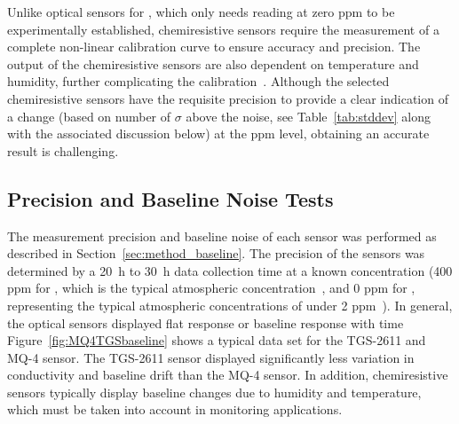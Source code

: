 \documentclass[sensors,article,submit,moreauthors,pdftex]{Definitions/mdpi}
\begin{document}
			Unlike optical sensors for , which only needs reading at zero ppm to be experimentally established, chemiresistive sensors require the measurement of a complete non-linear calibration curve to ensure accuracy and precision.
			The output of the chemiresistive sensors are also dependent on temperature and humidity, further complicating the calibration~\cite{benkstein_analytical_2014}.
			Although the selected chemiresistive sensors have the requisite precision to provide a clear indication of a change (based on number of $\sigma$ above the noise, see Table~\ref{tab:stddev} along with the associated discussion below) at the ppm level, obtaining an accurate result is challenging.
			

		\subsection{Precision and Baseline Noise Tests}
			\label{sec:main_baseline}
			
			The measurement precision and baseline noise of each sensor was performed as described in Section~\ref{sec:method_baseline}.
			The precision of the sensors was determined by a \SI{20}{\hour} to \SI{30}{\hour} data collection time at a known concentration (400 ppm for , which is the typical atmospheric concentration~\cite{blasing_recent_2016,dlugokencky_trends_2016}, and 0 ppm for , representing the typical atmospheric concentrations of under 2 ppm~\cite{turner_large_2016,bamberger_spatial_2014,dlugokencky_trends_2016-1}).
			In general, the optical sensors displayed flat response or baseline response with time
			Figure~\ref{fig:MQ4TGSbaseline} shows a typical data set for the TGS-2611 and MQ-4 sensor.
			The TGS-2611 sensor displayed significantly less variation in conductivity and baseline drift than the MQ-4 sensor.
			In addition, chemiresistive sensors typically display baseline changes due to humidity and temperature, which must be taken into account in monitoring applications.
			
\end{document}
